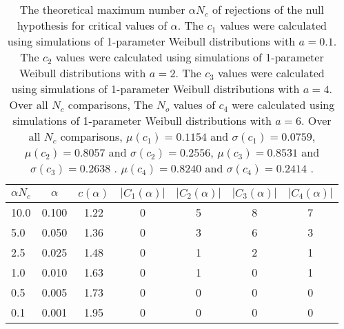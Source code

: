 \begin{table}[h!]
\begin{center}
\begin{tabular}{| l | c | c | c | c | c | c |}\hline
$\alpha N_c$ & $\alpha$ & $c(\alpha)$ & $|C_1(\alpha)|$ & $|C_2(\alpha)|$ & $|C_3(\alpha)|$ & $|C_4(\alpha)|$ \\\hline\hline
10.0 & 0.100 & 1.22 & 0 & 5 & 8 & 7 \\\hline
5.0 & 0.050 & 1.36 & 0 & 3 & 6 & 3 \\\hline
2.5 & 0.025 & 1.48 & 0 & 1 & 2 & 1 \\\hline
1.0 & 0.010 & 1.63 & 0 & 1 & 0 & 1 \\\hline
0.5 & 0.005 & 1.73 & 0 & 0 & 0 & 0 \\\hline
0.1 & 0.001 & 1.95 & 0 & 0 & 0 & 0 \\\hline
\end{tabular}
\caption{The theoretical maximum number $\alpha N_c$ of rejections
of the null hypothesis for critical values of $\alpha$.
The $c_1$ values were calculated using simulations of 1-parameter Weibull distributions with $a=0.1$.
The $c_2$ values were calculated using simulations of 1-parameter Weibull distributions with $a=2$.
The $c_3$ values were calculated using simulations of 1-parameter Weibull distributions with $a=4$.
Over all $N_c$ comparisons,
The $N_o$ values of $c_4$ were calculated using simulations of
 1-parameter Weibull distributions with $a=6$.
Over all $N_c$ comparisons,
 $\mu(c_1)=0.1154$ and $\sigma(c_1)=0.0759$,
 $\mu(c_2)=0.8057$ and $\sigma(c_2)=0.2556$,
 $\mu(c_3)=0.8531$ and $\sigma(c_3)=0.2638$ .
 $\mu(c_4)=0.8240$ and $\sigma(c_4)=0.2414$ .
}
\end{center}
\end{table}